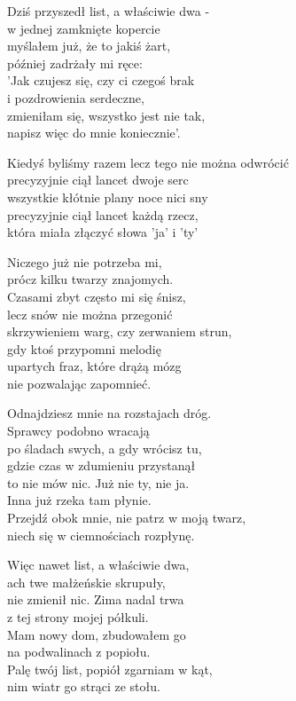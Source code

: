 \begin{text}
    Dziś przyszedł list, a właściwie dwa -\\
    w jednej zamknięte kopercie\\
    myślałem już, że to jakiś żart,\\
    później zadrżały mi ręce:\\
    'Jak czujesz się, czy ci czegoś brak\\
    i pozdrowienia serdeczne,\\
    zmieniłam się, wszystko jest nie tak,\\
    napisz więc do mnie koniecznie'.

    Kiedyś byliśmy razem lecz tego nie można odwrócić\\
    precyzyjnie ciął lancet dwoje serc\\
    wszystkie kłótnie plany noce nici sny\\
    precyzyjnie ciął lancet każdą rzecz,\\
    która miała złączyć słowa 'ja' i 'ty'

    Niczego już nie potrzeba mi,\\
    prócz kilku twarzy znajomych.\\
    Czasami zbyt często mi się śnisz,\\
    lecz snów nie można przegonić\\
    skrzywieniem warg, czy zerwaniem strun,\\
    gdy ktoś przypomni melodię\\
    upartych fraz, które drążą mózg\\
    nie pozwalając zapomnieć.

    Odnajdziesz mnie na rozstajach dróg.\\
    Sprawcy podobno wracają\\
    po śladach swych, a gdy wrócisz tu,\\
    gdzie czas w zdumieniu przystanął\\
    to nie mów nic. Już nie ty, nie ja.\\
    Inna już rzeka tam płynie.\\
    Przejdź obok mnie, nie patrz w moją twarz,\\
    niech się w ciemnościach rozpłynę.

    Więc nawet list, a właściwie dwa,\\
    ach twe małżeńskie skrupuły,\\
    nie zmienił nic. Zima nadal trwa\\
    z tej strony mojej półkuli.\\
    Mam nowy dom, zbudowałem go\\
    na podwalinach z popiołu.\\
    Palę twój list, popiół zgarniam w kąt,\\
    nim wiatr go strąci ze stołu.
\end{text}
